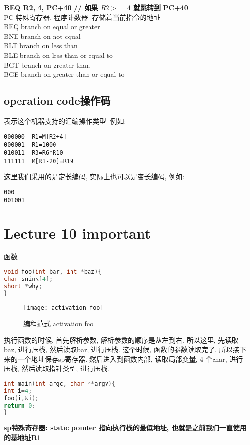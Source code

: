\documentclass{article}
\begin{document}
\bigskip\noindent
\textbf{BEQ R2, 4,  PC+40  // 如果 $R2 >=4$ 就跳转到 PC+40}\\
PC 特殊寄存器, 程序计数器, 存储着当前指令的地址\\
BEQ  branch on equal or greater\\
BNE branch on not equal\\
BLT branch on less than\\
BLE branch on less than or equal to\\
BGT branch on greater than\\
BGE branch on greater than or equal to\\

\subsection{operation code操作码}
表示这个机器支持的汇编操作类型,
例如:
\begin{verbatim}
000000	R1=M[R2+4]
000001	R1=1000
010011	R3=R6*R10
111111	M[R1-20]=R19
\end{verbatim}
这里我们采用的是定长编码,
实际上也可以是变长编码,
例如:
\begin{verbatim}
000
001001
\end{verbatim}

\section{Lecture 10 important}
函数
\begin{lstlisting}[language = C]
void foo(int bar, int *baz){
char snink[4];
short *why;
}
\end{lstlisting}
\begin{figure}[htbp]
	\centering
	\texttt{[image: activation-foo]}\\
	\caption{编程范式 activation foo}\label{fig.activation.foo}
\end{figure}

执行函数的时候, 首先解析参数, 解析参数的顺序是从左到右.
所以这里, 先读取baz, 进行压栈, 然后读取bar, 进行压栈.
这个时候, 函数的参数读取完了, 所以接下来的一个地址保存sp寄存器.
然后进入到函数内部, 读取局部变量, 4 个char, 进行压栈, 然后读取指针类型, 进行压栈.

\begin{lstlisting}[language = C]
int main(int argc, char **argv){
int i=4;
foo(i,&i);
return 0;
}
\end{lstlisting}

\textbf{sp特殊寄存器: static pointer 指向执行栈的最低地址, 也就是之前我们一直使用的基地址R1}
\end{document}
